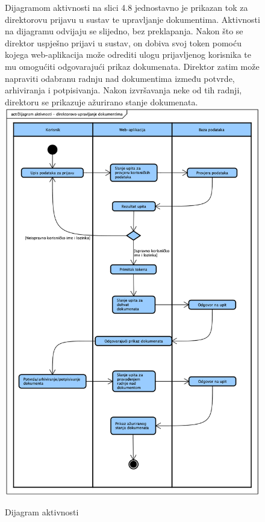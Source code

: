 			\begin{figure}[H]
				Dijagramom aktivnosti na slici 4.8 jednostavno je prikazan tok za direktorovu prijavu u sustav te upravljanje dokumentima. Aktivnosti na dijagramu
				odvijaju se slijedno, bez preklapanja. Nakon što se direktor uspješno prijavi u sustav, on dobiva svoj token pomoću kojega web-aplikacija može odrediti
				ulogu prijavljenog korisnika te mu omogućiti odgovarajući prikaz dokumenata. Direktor zatim može napraviti odabranu radnju nad dokumentima između potvrde,
				arhiviranja i potpisivanja. Nakon izvršavanja neke od tih radnji, direktoru se prikazuje ažurirano stanje dokumenata.
				\newline
				\includegraphics[width=\textwidth]{slike/Activity.png}
				\caption{Dijagram aktivnosti}
				\label{fig:Activity}
			\end{figure}
			
